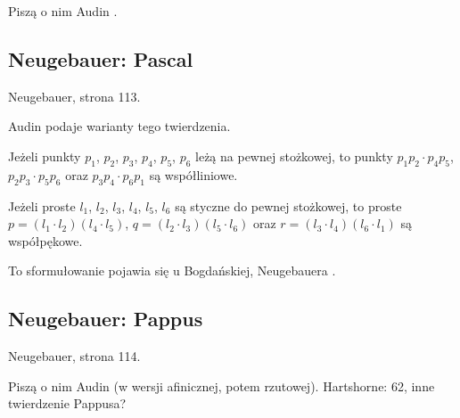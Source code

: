Piszą o nim Audin \cite[s. 26, 151]{audin_2003}.

\subsection{Neugebauer: Pascal}

\begin{proposition}
	Neugebauer, strona 113.
\end{proposition}

Audin \cite[s. 103, 107, 209]{audin_2003} podaje warianty tego twierdzenia.

\begin{theorem}[Pascala]
	Jeżeli punkty $p_1$, $p_2$, $p_3$, $p_4$, $p_5$, $p_6$ leżą na pewnej stożkowej, to punkty $p_1p_2 \cdot p_4p_5$, $p_2p_3 \cdot p_5p_6$ oraz $p_3p_4 \cdot p_6p_1$ są współliniowe.
\end{theorem}

\begin{theorem}[Brianchona]
	Jeżeli proste $l_1$, $l_2$, $l_3$, $l_4$, $l_5$, $l_6$ są styczne do pewnej stożkowej, to proste $p = (l_1 \cdot l_2)(l_4 \cdot l_5)$, $q = (l_2 \cdot l_3)(l_5 \cdot l_6)$ oraz $r = (l_3 \cdot l_4)(l_6 \cdot l_1)$ są współpękowe.
\end{theorem}


To sformułowanie pojawia się u Bogdańskiej, Neugebauera \cite[s. 265, 266]{neugebauer_2018}.


\subsection{Neugebauer: Pappus}

\begin{proposition}
	Neugebauer, strona 114.
\end{proposition}
Piszą o nim Audin \cite[s. 25, 151, 171]{audin_2003} (w wersji afinicznej, potem rzutowej).
Hartshorne: 62, inne twierdzenie Pappusa?


